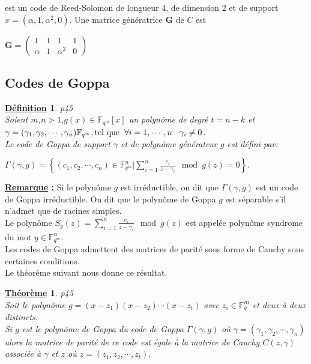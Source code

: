 \documentclass[12pt,openany]{report}
\newtheorem{theorem}{\underline{Théorème}}
\newtheorem{definition}{\underline{Définition}}
\begin{document}
  est un code de Reed-Solomon de longueur 4, de dimension 2 et de support $x=(\alpha,1,\alpha^2,0)$. Une matrice génératrice $\mathbf{G} $ de $\mathit{C} $ est 
  \begin{center}
   $\mathbf{G} = \begin{pmatrix} 
         
        1&1&1&1\\
        \alpha&1& \alpha^2& 0
   \end{pmatrix}$
  
  \end{center}
  \subsection{Codes de Goppa}
 \begin{definition} \cite{Ndollane} p45\\
  Soient $m$,$n>1$,$ g(x)\in \mathbb{F}_{q^m}[x]$ un polynôme de degré $t=n-k$ et $\gamma=(\gamma_1,\gamma_2,\cdots,\gamma_n) \mathbb{F}_{q^m} ,\\ \text{tel que}\hspace{0.2cm}\forall i=1,\cdots,n \hspace{0.3cm} \gamma_i \neq 0 $.\\
  Le code de Goppa de support $ \gamma $ et de polynôme générateur $g$ est défini par:
\begin{center}
\scalebox{2}

$ \Gamma(\gamma,g)=\left\lbrace  (c_1,c_2,\cdots,c_n)\in \mathbb{F}_{q^m}^{n} | \sum_{i=1}^{n}\frac{c_i}{z-\gamma_i}\mod g(z)=0 \right\rbrace                       $.
\end{center} 
\end{definition}
\textbf{\underline{Remarque} :} 
Si le polynôme $g$ est irréductible, on dit que $\Gamma(\gamma,g)$ est un code de Goppa irréductible.
On dit que le polynôme de Goppa $g$ est séparable s'il n'admet que de racines simples.\\
Le polynôme $\mathit{S}_{y}(z)= \sum_{i=1}^{n}\frac{c_i}{z-\gamma_i}\mod g(z)$ est appelée polynôme syndrome du mot $y \in \mathbb{F}_{q^m}^{n} $.\\

Les codes de Goppa admettent des matrices de parité sous forme de Cauchy sous certaines conditions.\\
Le théorème suivant nous donne ce résultat.
\begin{theorem}\cite{Ndollane}p45 \\
Soit le polynôme $g=(x-z_1)(x-z_2)\cdots(x-z_t) $ avec $z_i \in \mathbb{F}_{q}^{m} $ et deux à deux distincts.\\
Si $g$ est le polynôme de Goppa du code de Goppa $\Gamma(\gamma,g)$ où 
$\gamma=(\gamma_1,\gamma_2,\cdots,\gamma_n)$ alors la matrice de parité de ce code est égale à la matrice de Cauchy $\mathit{C}(z,\gamma)$ associée à $\gamma$ et $z$ où $z=(z_1,z_2,\cdots,z_t).$
\end{theorem}
\end{document}
